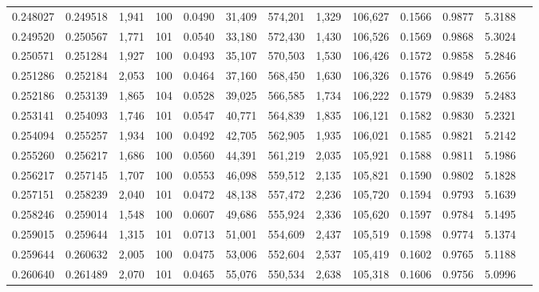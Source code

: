\begin{tabular}{rrrrrrrrrrrrr}
0.248027 & 0.249518 & 1,941 & 100 &                                     0.0490 &  31,409 & 574,201 &   1,329 & 106,627 & 0.1566 & 0.9877 & 5.3188 \\
0.249520 & 0.250567 & 1,771 & 101 &                                     0.0540 &  33,180 & 572,430 &   1,430 & 106,526 & 0.1569 & 0.9868 & 5.3024 \\
0.250571 & 0.251284 & 1,927 & 100 &                                     0.0493 &  35,107 & 570,503 &   1,530 & 106,426 & 0.1572 & 0.9858 & 5.2846 \\
0.251286 & 0.252184 & 2,053 & 100 &                                     0.0464 &  37,160 & 568,450 &   1,630 & 106,326 & 0.1576 & 0.9849 & 5.2656 \\
0.252186 & 0.253139 & 1,865 & 104 &                                     0.0528 &  39,025 & 566,585 &   1,734 & 106,222 & 0.1579 & 0.9839 & 5.2483 \\
0.253141 & 0.254093 & 1,746 & 101 &                                     0.0547 &  40,771 & 564,839 &   1,835 & 106,121 & 0.1582 & 0.9830 & 5.2321 \\
0.254094 & 0.255257 & 1,934 & 100 &                                     0.0492 &  42,705 & 562,905 &   1,935 & 106,021 & 0.1585 & 0.9821 & 5.2142 \\
0.255260 & 0.256217 & 1,686 & 100 &                                     0.0560 &  44,391 & 561,219 &   2,035 & 105,921 & 0.1588 & 0.9811 & 5.1986 \\
0.256217 & 0.257145 & 1,707 & 100 &                                     0.0553 &  46,098 & 559,512 &   2,135 & 105,821 & 0.1590 & 0.9802 & 5.1828 \\
0.257151 & 0.258239 & 2,040 & 101 &                                     0.0472 &  48,138 & 557,472 &   2,236 & 105,720 & 0.1594 & 0.9793 & 5.1639 \\
0.258246 & 0.259014 & 1,548 & 100 &                                     0.0607 &  49,686 & 555,924 &   2,336 & 105,620 & 0.1597 & 0.9784 & 5.1495 \\
0.259015 & 0.259644 & 1,315 & 101 &                                     0.0713 &  51,001 & 554,609 &   2,437 & 105,519 & 0.1598 & 0.9774 & 5.1374 \\
0.259644 & 0.260632 & 2,005 & 100 &                                     0.0475 &  53,006 & 552,604 &   2,537 & 105,419 & 0.1602 & 0.9765 & 5.1188 \\
0.260640 & 0.261489 & 2,070 & 101 &                                     0.0465 &  55,076 & 550,534 &   2,638 & 105,318 & 0.1606 & 0.9756 & 5.0996 \\

\end{tabular}
